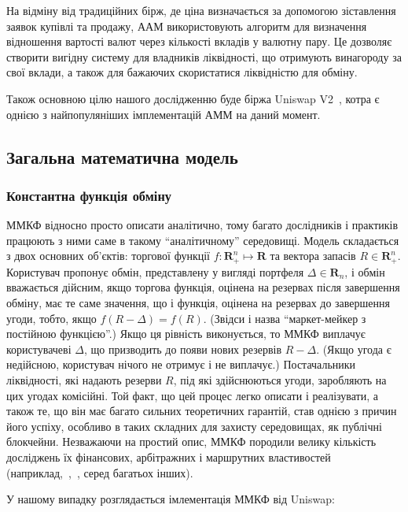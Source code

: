 \documentclass[14pt]{extarticle}
\begin{document}
На відміну від традиційних бірж, де ціна
визначається за допомогою зіставлення заявок купівлі та продажу, ААМ
використовують алгоритм для визначення відношення вартості валют через кількості
вкладів у валютну пару. Це дозволяє створити вигідну систему для владників
ліквідності, що отримують винагороду за свої вклади, а також для бажаючих
скористатися ліквідністю для обміну.

Також основною цілю нашого дослідженню буде біржа Uniswap V2~\cite{adams2021uniswap},
котра є однією з найпопуляніших імплементацій АММ на даний момент.

\subsection{Загальна математична модель}\label{sec:math-model}

\subsubsection{Константна функція обміну}

ММКФ відносно просто описати аналітично, тому багато дослідників і практиків
працюють з ними саме в такому ``аналітичному'' середовищі. Модель складається з
двох основних об'єктів: торгової функції $f : \mathbf{R}_{+}^{n} \mapsto \mathbf{R}$
та вектора запасів $R \in \mathbf{R}^{n}_{+}$. Користувач пропонує обмін, представлену у
вигляді портфеля $\Delta \in \mathbf{R}_{n}$, і обмін вважається дійсним, якщо торгова функція,
оцінена на резервах після завершення обміну, має те саме значення, що і функція,
оцінена на резервах до завершення угоди, тобто, якщо $f(R - \Delta) = f(R)$. (Звідси
і назва ``маркет-мейкер з постійною функцією''.) Якщо ця рівність виконується,
то ММКФ виплачує користувачеві $\Delta$, що призводить до появи нових резервів
$R - \Delta$. (Якщо угода є недійсною, користувач нічого не отримує і не виплачує.)
Постачальники ліквідності, які надають резерви $R$, під які здійснюються угоди,
заробляють на цих угодах комісійні. Той факт, що цей процес легко описати і
реалізувати, а також те, що він має багато сильних теоретичних гарантій, став
однією з причин його успіху, особливо в таких складних для захисту середовищах,
як публічні блокчейни. Незважаючи на простий опис, ММКФ породили велику
кількість досліджень їх фінансових, арбітражних і маршрутних властивостей
(наприклад,~\cite{Angeris_2020},~\cite{danos}, серед багатьох інших).

У нашому випадку розглядається імлементація ММКФ від Uniswap:
\end{document}
